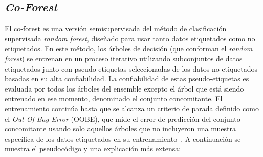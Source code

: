 \subsection{\textit{Co-Forest}}
El co-forest es una versión semisupervisada del método de clasificación supervisada \textit{random forest}, diseñado para usar tanto datos etiquetados como no etiquetados. En este método, los árboles de decisión (que conforman el \textit{random forest}) se entrenan en un proceso iterativo utilizando subconjuntos de datos etiquetados junto con pseudo-etiquetas seleccionadas de los datos no etiquetados basadas en su alta confiabilidad. La confiabilidad de estas pseudo-etiquetas es evaluada por todos los árboles del ensemble excepto el árbol que está siendo entrenado en ese momento, denominado el conjunto concomitante. El entrenamiento continúa hasta que se alcanza un criterio de parada definido como el \textit{Out Of Bag Error} (OOBE), que mide el error de predicción del conjunto concomitante usando solo aquellos árboles que no incluyeron una muestra específica de los datos etiquetados en su entrenamiento~\cite{IEEE:CoForest}. A continuación se muestra el pseudocódigo y una explicación más extensa:
